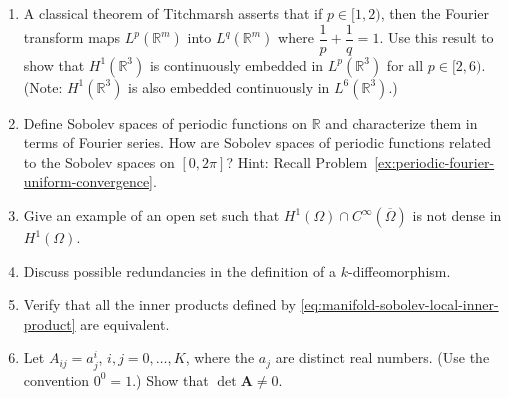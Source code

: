 \begin{enumerate}[label=\thesection.\arabic*.,ref=\thesection.\arabic*,start=1,series=book-problems]
\item\label{ex:titchmarsh-fourier-l-p-sobolev-embedding} A classical theorem of Titchmarsh asserts that if $p\in[1,2)$, then the Fourier transform maps $L^p(\mathbb{R}^m)$ into $L^q(\mathbb{R}^m)$ where $\dfrac{1}{p}+\dfrac{1}{q}=1$. Use this result to show that $H^1(\mathbb{R}^3)$ is continuously embedded in $L^p(\mathbb{R}^3)$ for all $p\in[2,6)$. (Note: $H^1(\mathbb{R}^3)$ is also embedded continuously in $L^6(\mathbb{R}^3)$.)

\item\label{ex:periodic-sobolev-spaces-fourier-characterization} Define Sobolev spaces of periodic functions on $\mathbb{R}$ and characterize them in terms of Fourier series. How are Sobolev spaces of periodic functions related to the Sobolev spaces on $[0,2\pi]$? Hint: Recall Problem~\ref{ex:periodic-fourier-uniform-convergence}.

\item\label{ex:boundary-smooth-functions-not-dense-open-set-example} Give an example of an open set such that $H^1(\Omega)\cap C^{\infty}(\overline\Omega)$ is not dense in $H^1(\Omega)$.

\item\label{ex:k-diffeomorphism-definition-redundancies} Discuss possible redundancies in the definition of a $k$-diffeomorphism.

\item\label{ex:manifold-sobolev-inner-products-equivalence} Verify that all the inner products defined by \eqref{eq:manifold-sobolev-local-inner-product} are equivalent.

\item\label{ex:vandermonde-matrix-nonsingularity} Let $A_{ij}=a_j^i$, $i,j=0,\ldots,K$, where the $a_j$ are distinct real numbers. (Use the convention $0^0=1$.) Show that $\det\bm{A}\ne0$.

\end{enumerate}
